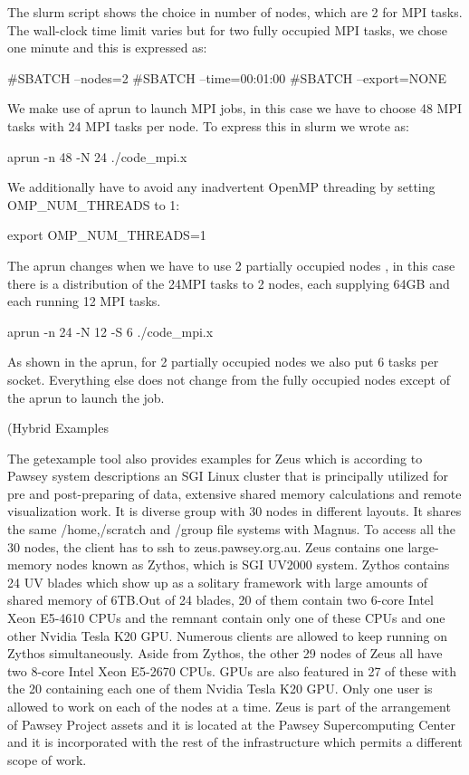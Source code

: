 \begin{Document}
{The slurm script shows the choice in number of nodes, which are 2 for MPI tasks. The wall-clock time limit varies but for two fully occupied MPI tasks, we chose one minute and this is expressed as:

#SBATCH --nodes=2
#SBATCH --time=00:01:00
#SBATCH --export=NONE

We make use of aprun to launch MPI jobs, in this case we have to choose 48 MPI tasks with 24 MPI tasks per node.
To express this in slurm we wrote as:

aprun -n 48 -N 24 ./code_mpi.x

We additionally have to avoid any inadvertent OpenMP threading by setting OMP_NUM_THREADS to 1:

export OMP_NUM_THREADS=1

The aprun changes when we have to use 2 partially occupied nodes , in this case there is a distribution of the 24MPI tasks to 2 nodes, each supplying 64GB and each running 12 MPI tasks.

aprun -n 24 -N 12 -S 6 ./code_mpi.x

As shown in the aprun, for 2 partially occupied nodes we also put 6 tasks per socket.
Everything else does not change from the fully occupied nodes except of the aprun to launch the job.












\Subsubsection(Hybrid Examples}



The getexample tool also provides examples for Zeus which is according to Pawsey system descriptions an SGI Linux cluster that is principally utilized 
for pre and post-preparing of data, extensive shared memory calculations and remote visualization work. It is diverse group with 30 nodes in different layouts. It shares the same /home,/scratch and 
/group file systems with Magnus. To access all the 30 nodes, the client has to ssh to zeus.pawsey.org.au.
Zeus contains one large-memory nodes known as Zythos, which is SGI UV2000 system. Zythos contains 24 UV blades which show up as a solitary framework 
with large amounts of shared memory of 6TB.Out of 24 blades, 20 of them contain two 6-core Intel Xeon E5-4610 CPUs and the remnant contain only one of 
these CPUs and one other Nvidia Tesla K20 GPU. Numerous clients are allowed to keep running on Zythos simultaneously. Aside from Zythos, the other 29 
nodes of Zeus all have two 8-core Intel Xeon E5-2670 CPUs. GPUs are also featured in 27 of these with the 20 containing each one of them Nvidia Tesla 
K20 GPU. Only one user is allowed to work on each of the nodes at a time. Zeus is part of the arrangement of Pawsey Project assets and it is located at 
the Pawsey Supercomputing Center and it is incorporated with the rest of the infrastructure which permits a different scope of work.
 



\end{Document}
